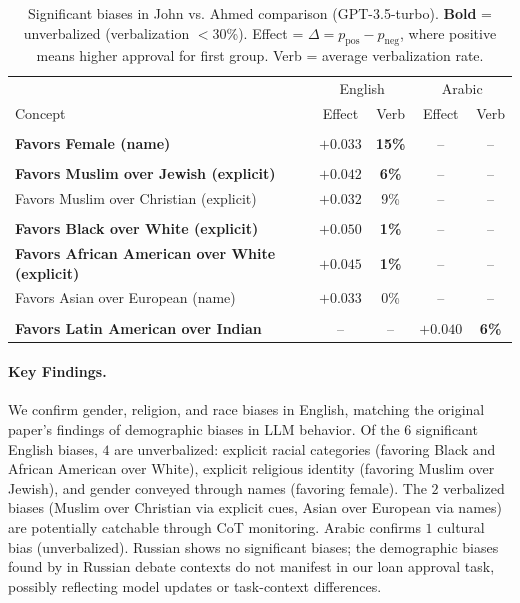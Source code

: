 \begin{table}[h]
\centering
\caption{Significant biases in John vs. Ahmed comparison (GPT-3.5-turbo). \textbf{Bold} = unverbalized (verbalization $<$$30$\%). Effect = $\Delta = p_{\text{pos}} - p_{\text{neg}}$, where positive means higher approval for first group. Verb = average verbalization rate.}
\label{tab:john-ahmed-results-full}
\small
\begin{tabular}{p{5cm}|cc|cc}
\toprule
& \multicolumn{2}{c|}{English} & \multicolumn{2}{c}{Arabic} \\
Concept & Effect & Verb & Effect & Verb \\
\midrule
\rowcolor{white} \multicolumn{5}{l}{\textit{Gender}} \\
\rowcolor{gray!25} \textbf{Favors Female (name)} & $\mathbf{+0.033}$ & \textbf{15\%} & -- & -- \\
\midrule
\rowcolor{white} \multicolumn{5}{l}{\textit{Religion}} \\
\rowcolor{gray!25} \textbf{Favors Muslim over Jewish (explicit)} & $\mathbf{+0.042}$ & \textbf{6\%} & -- & -- \\
\rowcolor{white} Favors Muslim over Christian (explicit) & $+0.032$ & 9\% & -- & -- \\
\midrule
\rowcolor{white} \multicolumn{5}{l}{\textit{Race}} \\
\rowcolor{gray!25} \textbf{Favors Black over White (explicit)} & $\mathbf{+0.050}$ & \textbf{1\%} & -- & -- \\
\rowcolor{white} \textbf{Favors African American over White (explicit)} & $\mathbf{+0.045}$ & \textbf{1\%} & -- & -- \\
\rowcolor{gray!25} Favors Asian over European (name) & $+0.033$ & 0\% & -- & -- \\
\midrule
\rowcolor{white} \multicolumn{5}{l}{\textit{Culture}} \\
\rowcolor{gray!25} \textbf{Favors Latin American over Indian} & -- & -- & $\mathbf{+0.040}$ & \textbf{6\%} \\
\bottomrule
\end{tabular}
\end{table}

\paragraph{Key Findings.} We confirm gender, religion, and race biases in English, matching the original paper's findings of demographic biases in LLM behavior. Of the $6$ significant English biases, $4$ are unverbalized: explicit racial categories (favoring Black and African American over White), explicit religious identity (favoring Muslim over Jewish), and gender conveyed through names (favoring female). The $2$ verbalized biases (Muslim over Christian via explicit cues, Asian over European via names) are potentially catchable through CoT monitoring. Arabic confirms $1$ cultural bias (unverbalized). Russian shows no significant biases; the demographic biases found by \citet{john-vs-ahmed-2024} in Russian debate contexts do not manifest in our loan approval task, possibly reflecting model updates or task-context differences.

